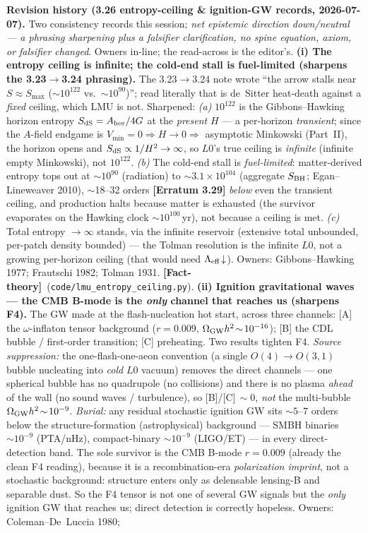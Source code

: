 \documentclass[11pt]{article}
\newcommand{\factth}{\textcolor{green!40!black}{\textbf{[Fact-theory]}}}
\begin{document}
{\smallskip\noindent\textbf{Revision history (3.26 entropy-ceiling \& ignition-GW records, 2026-07-07).} Two consistency records this session; \emph{net epistemic direction down/neutral --- a phrasing sharpening plus a falsifier clarification, no spine equation, axiom, or falsifier changed}. Owners in-line; the read-across is the editor's. \textbf{(i) The entropy ceiling is infinite; the cold-end stall is fuel-limited (sharpens the 3.23$\to$3.24 phrasing).} The 3.23$\to$3.24 note wrote ``the arrow stalls near $S\!\approx\!S_{\max}$ ($\sim\!10^{122}$ vs.\ $\sim\!10^{90}$)''; read literally that is de~Sitter heat-death against a \emph{fixed} ceiling, which LMU is not. Sharpened: \emph{(a)} $10^{122}$ is the Gibbons--Hawking horizon entropy $S_{\rm dS}=A_{\rm hor}/4G$ at the \emph{present} $H$ --- a per-horizon \emph{transient}; since the $A$-field endgame is $V_{\min}=0\Rightarrow H\to0\Rightarrow$ asymptotic Minkowski (Part~II), the horizon opens and $S_{\rm dS}\propto1/H^2\to\infty$, so $L0$'s true ceiling is \emph{infinite} (infinite empty Minkowski), not $10^{122}$. \emph{(b)} The cold-end stall is \emph{fuel-limited}: matter-derived entropy tops out at $\sim\!10^{90}$ (radiation) to $\sim\!3.1\times10^{104}$ (aggregate $S_{\rm BH}$; Egan--Lineweaver 2010), $\sim$18--32 orders \textbf{[Erratum 3.29]} \emph{below} even the transient ceiling, and production halts because matter is exhausted (the survivor evaporates on the Hawking clock $\sim\!10^{100}$\,yr), not because a ceiling is met. \emph{(c)} Total entropy $\to\infty$ stands, via the infinite reservoir (extensive total unbounded, per-patch density bounded) --- the Tolman resolution is the infinite $L0$, not a growing per-horizon ceiling (that would need $\Lambda_{\rm eff}\!\downarrow$). Owners: Gibbons--Hawking 1977; Frautschi 1982; Tolman 1931. \factth\ (\texttt{code/lmu\_entropy\_ceiling.py}). \textbf{(ii) Ignition gravitational waves --- the CMB B-mode is the \emph{only} channel that reaches us (sharpens F4).} The GW made at the flash-nucleation hot start, across three channels: [A] the $\omega$-inflaton tensor background ($r\!=\!0.009$, $\Omega_{\rm GW}h^2\!\sim\!10^{-16}$); [B] the CDL bubble / first-order transition; [C] preheating. Two results tighten F4. \emph{Source suppression:} the one-flash-one-aeon convention (a single $O(4)\!\to\!O(3,1)$ bubble nucleating into \emph{cold} $L0$ vacuum) removes the direct channels --- one spherical bubble has no quadrupole (no collisions) and there is no plasma \emph{ahead} of the wall (no sound waves / turbulence), so [B]/[C]$\,\sim\!0$, \emph{not} the multi-bubble $\Omega_{\rm GW}h^2\!\sim\!10^{-9}$. \emph{Burial:} any residual stochastic ignition GW sits $\sim\!5$--$7$ orders below the structure-formation (astrophysical) background --- SMBH binaries $\sim\!10^{-9}$ (PTA/nHz), compact-binary $\sim\!10^{-9}$ (LIGO/ET) --- in every direct-detection band. The sole survivor is the CMB B-mode $r\!=\!0.009$ (already the clean F4 reading), because it is a recombination-era \emph{polarization imprint}, not a stochastic background: structure enters only as delensable lensing-B and separable dust. So the F4 tensor is not one of several GW signals but the \emph{only} ignition GW that reaches us; direct detection is correctly hopeless. Owners: Coleman--De~Luccia 1980; }
\end{document}

